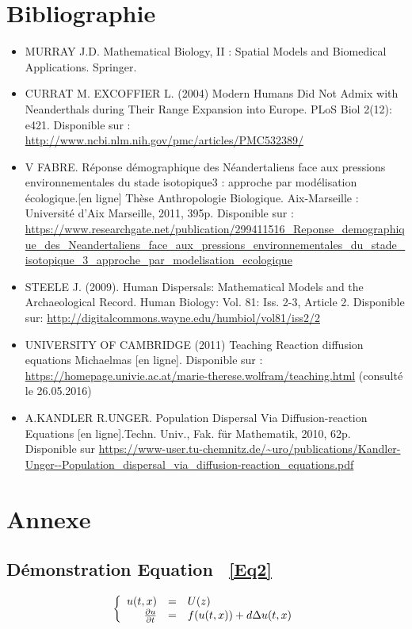 \documentclass[a4paper,11pt]{article}
\begin{document}
\section{Bibliographie}
\begin{itemize}
    \item MURRAY J.D. Mathematical Biology, II : Spatial Models and Biomedical Applications. Springer.
    \item CURRAT M. EXCOFFIER L. (2004) Modern Humans Did Not Admix with Neanderthals during Their Range Expansion into Europe. PLoS Biol 2(12): e421. Disponible sur : \url{http://www.ncbi.nlm.nih.gov/pmc/articles/PMC532389/}
	\item V FABRE. Réponse démographique des Néandertaliens face aux pressions environnementales du stade isotopique3 : approche par modélisation écologique.[en ligne] Thèse Anthropologie Biologique. Aix-Marseille : Université d'Aix Marseille, 2011, 395p. Disponible sur : \url{ https://www.researchgate.net/publication/299411516_Reponse_demographique_des_Neandertaliens_face_aux_pressions_environnementales_du_stade_isotopique_3_approche_par_modelisation_ecologique}
	\item STEELE J. (2009). Human Dispersals: Mathematical Models and the Archaeological Record. Human Biology: Vol. 81: Iss. 2-3, Article 2. Disponible sur: \url{http://digitalcommons.wayne.edu/humbiol/vol81/iss2/2}
    \item UNIVERSITY OF CAMBRIDGE (2011) Teaching Reaction diffusion equations Michaelmas [en ligne]. Disponible sur : \url{https://homepage.univie.ac.at/marie-therese.wolfram/teaching.html} (consulté le 26.05.2016)
    \item A.KANDLER R.UNGER. Population Dispersal Via Diffusion-reaction Equations [en ligne].Techn. Univ., Fak. für Mathematik, 2010, 62p. Disponible sur \url{https://www-user.tu-chemnitz.de/~uro/publications/Kandler-Unger--Population_dispersal_via_diffusion-reaction_equations.pdf}
\end{itemize}

\section{Annexe}
\subsection{Démonstration Equation ~\eqref{Eq2}}

\[
\left\{
\begin{array}{r c l}
u(t,x)&=&U(z)\\
\frac{\partial u}{\partial t}&=&f(u(t,x))+d\Delta u(t,x)
\end{array}
\right.
\]
\end{document}
